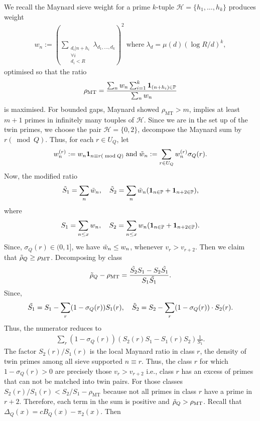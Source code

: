 \documentclass[11pt,reqno]{amsart}
\theoremstyle{plain}\newtheorem{theorem}{Theorem}[section]
\numberwithin{equation}{section}
\begin{document}
\medskip
\noindent
We recall the Maynard sieve weight for a prime $k$-tuple $\mathcal{H}=\{h_1,\ldots, h_k\}$ produces weight
\begin{align*}
w_n:=\left(\sum_{\substack{d_i|n+h_i\\\forall i\\ d_i<R}}\lambda_{d_1,\ldots, d_k}\right)^2\; \text{where}\; \lambda_d=\mu(d)(\log R/d)^k,    
\end{align*}
optimised so that the ratio
\begin{align*}
\rho_{\mathrm{MT}}
=\frac{\sum_{n}w_n\sum_{i=1}^{k}{\bf{1}}_{(n+h_i)\in\mathbb{P}}}{\sum_{n}w_n}
\end{align*}
is maximised. For bounded gaps, Maynard showed $\rho_{\mathrm{MT}}>m$, implies at least $m+1$ primes in infinitely many touples of $\mathcal{H}$. Since we are in the set up of the twin primes, we choose the pair $\mathcal{H}=\{0,2\}$, decompose the Maynard sum by $r(\bmod{Q})$. Thus, for each $r\in U_Q$, let 
\begin{align*}
w_n^{(r)}:= w_n{\bf{1}}_{n\equiv r(\bmod{Q})}\;\text{and}\;
\Tilde{w}_n:=\sum_{r\in U_Q} w_n^{(r)}\sigma_Q(r).
\end{align*}
Now, the modified ratio
\begin{align*}
\Tilde{S}_1
=\sum_{n}\Tilde{w}_n,
\quad \Tilde{S}_2 
=\sum_{n}\Tilde{w}_n({\bf{1}}_{n\in\mathbb{P}}+{\bf{1}}_{n+2\in\mathbb{P}}),
\end{align*}
where
\begin{align*}
S_1=\sum_{n\leq x}w_n,\quad
S_2=\sum_{n\leq x} w_n({\bf{1}}_{n\in\mathbb{P}}+{\bf{1}}_{n+2\in\mathbb{P}}).
\end{align*}
Since, $\sigma_Q(r)\in(0,1]$, we have $\Tilde{w}_n\leq w_n$, whenever $v_r>v_{r+2}$. Then we claim that $\Tilde{\rho}_Q\geq \rho_{\mathrm{MT}}$. Decomposing by class
\begin{align*}
\Tilde{\rho}_Q-\rho_{\mathrm{MT}}
=\frac{\Tilde{S_2}S_1-S_2\Tilde{S_1}}{S_1\Tilde{S_1}}.
\end{align*}
\noindent
Since,
\begin{align*}
\Tilde{S_1}
=S_1-\sum_{r}(1-\sigma_Q(r))S_1(r),\quad \Tilde{S}_2=S_2-\sum_{r}(1-\sigma_Q(r))\cdot S_2(r).
\end{align*}
\noindent
Thus, the numerator reduces to
\begin{align*}
\sum_{r}(1-\sigma_Q(r))(S_2(r)S_1-S_1(r)S_2)\frac{1}{S_1}.
\end{align*}
The factor $S_2(r)/S_1(r)$ is the local Maynard ratio in class $r$, the density of twin primes among all sieve supported $n\equiv r$. Thus, the class $r$ for which $1-\sigma_Q(r)>0$ are precisely those $v_r>v_{r+2}$ i.e., class $r$ has an excess of primes that can not be matched into twin pairs. For those classes $S_2(r)/S_1(r)<S_2/S_1-\rho_{\mathrm{MT}}$ because not all primes in class $r$ have a prime in $r+2$. Therefore, each term in the sum is positive and $\Tilde{\rho}_Q>\rho_{\mathrm{MT}}$. Recall that $\Delta_Q(x)=cB_Q(x)-\pi_2(x)$. Then
\end{document}
